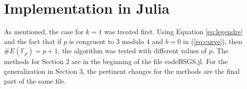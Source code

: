 \documentclass[letter,11pt,reqno]{article}
\theoremstyle{definition}
\theoremstyle{definition}
\theoremstyle{definition}
\theoremstyle{remark}
\theoremstyle{definition}
\theoremstyle{definition}
\newcommand{\Fp}{\mathbb{F}_p}
\newcommand*{\myfont}{\fontfamily{<cmss>}\selectfont}
\begin{document}
\section{Implementation in Julia}

As mentioned, the case for $k=1$ was treated first. Using Equation \ref{eq:legendre} and the fact that if $p$ is congruent to $3$ modulo $4$ and $b=0$ in (\ref{eq:curve}), then $\#E(\Fp) = p+1$, the algorithm was tested with different values of $p$. The methods for Section 2 are in the beginning of the file {\myfont codeBSGS.jl}. For the generalization in Section 3, the pertinent changes for the methods are the final part of the same file. 
\newpage

%



%

\printbibliography
\end{document}
